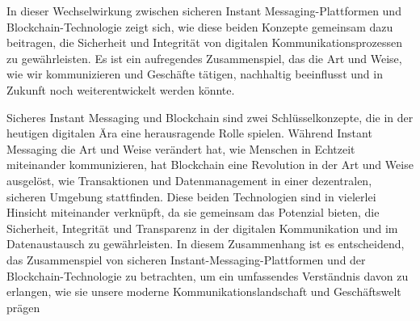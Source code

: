 In dieser Wechselwirkung zwischen sicheren Instant Messaging-Plattformen und Blockchain-Technologie zeigt sich, wie diese beiden Konzepte gemeinsam dazu beitragen, die Sicherheit und Integrität von digitalen Kommunikationsprozessen zu gewährleisten. Es ist ein aufregendes Zusammenspiel, das die Art und Weise, wie wir kommunizieren und Geschäfte tätigen, nachhaltig beeinflusst und in Zukunft noch weiterentwickelt werden könnte.

Sicheres Instant Messaging und Blockchain sind zwei Schlüsselkonzepte, die in der heutigen digitalen Ära eine herausragende Rolle spielen. Während Instant Messaging die Art und Weise verändert hat, wie Menschen in Echtzeit miteinander kommunizieren, hat Blockchain eine Revolution in der Art und Weise ausgelöst, wie Transaktionen und Datenmanagement in einer dezentralen, sicheren Umgebung stattfinden. Diese beiden Technologien sind in vielerlei Hinsicht miteinander verknüpft, da sie gemeinsam das Potenzial bieten, die Sicherheit, Integrität und Transparenz in der digitalen Kommunikation und im Datenaustausch zu gewährleisten. In diesem Zusammenhang ist es entscheidend, das Zusammenspiel von sicheren Instant-Messaging-Plattformen und der Blockchain-Technologie zu betrachten, um ein umfassendes Verständnis davon zu erlangen, wie sie unsere moderne Kommunikationslandschaft und Geschäftswelt prägen